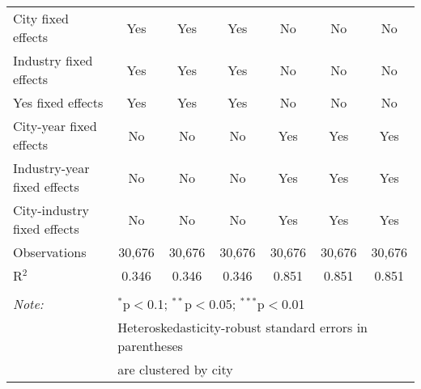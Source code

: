 \documentclass[12pt]{article}
\begin{document}
\begin{table}[!htbp]
\begin{adjustbox}{width=\textwidth, totalheight=\baselineskip,keepaspectratio}
\begin{tabular}{@{\extracolsep{5pt}}lcccccc}
City fixed effects & Yes & Yes & Yes & No & No & No \\ 
Industry fixed effects & Yes & Yes & Yes & No & No & No \\ 
Yes fixed effects & Yes & Yes & Yes & No & No & No \\ 
City-year fixed effects & No & No & No & Yes & Yes & Yes \\ 
Industry-year fixed effects & No & No & No & Yes & Yes & Yes \\ 
City-industry fixed effects & No & No & No & Yes & Yes & Yes \\ 
Observations & 30,676 & 30,676 & 30,676 & 30,676 & 30,676 & 30,676 \\ 
R$^{2}$ & 0.346 & 0.346 & 0.346 & 0.851 & 0.851 & 0.851 \\ 
\hline 
\hline \\[-1.8ex] 
\textit{Note:}  & \multicolumn{6}{l}{$^{*}$p$<$0.1; $^{**}$p$<$0.05; $^{***}$p$<$0.01} \\ 
 & \multicolumn{6}{l}{Heteroskedasticity-robust standard errors in parentheses} \\ 
 & \multicolumn{6}{l}{are clustered by city} \\ 
\end{tabular}
\end{adjustbox}
\end{table} 
\end{document}
